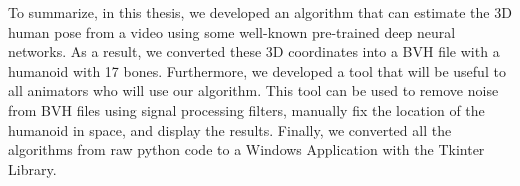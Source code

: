 To summarize, in this thesis, we developed an algorithm that can estimate the 3D human pose from a video using some well-known pre-trained deep neural networks. As a result, we converted these 3D coordinates into a BVH file with a humanoid with 17 bones. Furthermore, we developed a tool that will be useful to all animators who will use our algorithm. This tool can be used to remove noise from BVH files using signal processing filters, manually fix the location of the humanoid in space, and display the results. Finally, we converted all the algorithms from raw python code to a Windows Application with the Tkinter Library.
